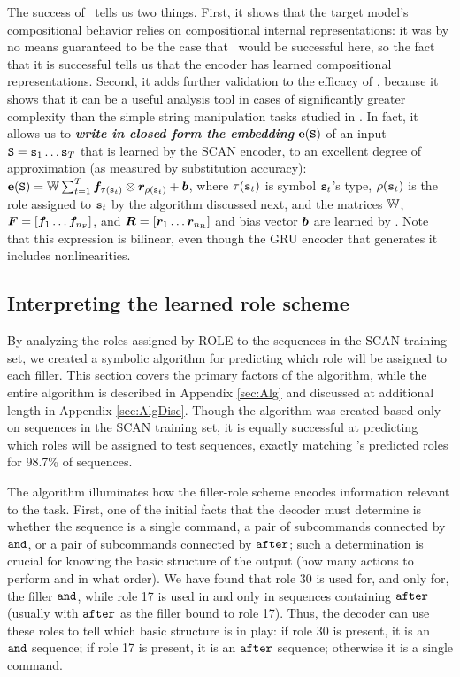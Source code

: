The success of \RLN\ 
tells us two things. First, it shows that the target model's compositional behavior relies on compositional internal representations: it was by no means guaranteed to be the case that \RLN\ would be successful here, so the fact that it is successful tells us that the encoder has learned compositional representations. Second, it adds further validation to the efficacy of \RLN, because it shows that it can be a useful analysis tool in cases of significantly greater complexity than the simple string manipulation tasks studied in \citet{mccoy}. 
In fact, it allows us to \textit{\textbf{write in closed form the embedding}} ${\mathbf{e}}({\mathtt{S}})$ of an input ${\mathtt{S}} = {\mathtt{s}}_1\ldots{\mathtt{s}}_T$ that is learned by the SCAN encoder, to an excellent degree of approximation (as measured by substitution accuracy):
${\mathbf{e}}({\mathtt{S}}) = {\mathbb{W}} \sum_{t=1}^T {\bm{f}}_{\tau({\mathtt{s}}_t)} \otimes {\bm{r}}_{\rho({\mathtt{s}}_t)} + {\bm{b}}$, where $\tau({\mathtt{s}}_t)$ is symbol ${\mathtt{s}}_t$'s type, $\rho({\mathtt{s}}_t)$ is the role assigned to ${\mathtt{s}}_t$ by the algorithm discussed next,
and the matrices ${\mathbb{W}}$, ${\bm{F}} = [{\bm{f}}_1 \ldots {\bm{f}}_{n_{\mathrm{F}}} ]$, and ${\bm{R}} = [{\bm{r}}_1 \ldots {\bm{r}}_{n_{\mathrm{R}}}]$ and bias vector ${\bm{b}}$ are learned by \RLN.
Note that this expression is bilinear, even though the GRU encoder that generates it includes nonlinearities.

\subsection{Interpreting the learned role scheme}\label{sec:scan-role-interpretation}

By analyzing the roles assigned by ROLE to the sequences in the SCAN training set, we created a symbolic algorithm for predicting which role will be assigned to each filler. This section covers the primary factors of the algorithm, while the entire algorithm is described in Appendix \ref{sec:Alg} and discussed at additional length in Appendix \ref{sec:AlgDisc}. Though the algorithm was created based only on sequences in the SCAN training set, it is equally successful at predicting which roles will be assigned to test sequences, exactly matching \RLN's predicted roles for 98.7\% of sequences.

The algorithm illuminates how the filler-role scheme encodes information relevant to the task. First, one of the initial facts that the decoder must determine is whether the sequence is a single command, a pair of subcommands connected by \textcolor{violet}{${\mathtt{and}}$}, or a pair of subcommands connected by \textcolor{violet}{${\mathtt{after}}$}; such a determination is crucial for knowing the basic structure of the output (how many actions to perform and in what order). We have found that role 30 is used for, and only for, the filler \textcolor{violet}{${\mathtt{and}}$}, while role 17 is used in and only in sequences containing \textcolor{violet}{${\mathtt{after}}$} (usually with \textcolor{violet}{${\mathtt{after}}$} as the filler bound to role 17). Thus, the decoder can use these roles to tell which basic structure is in play: if role 30 is present, it is an \textcolor{violet}{${\mathtt{and}}$} sequence; if role 17 is present, it is an \textcolor{violet}{${\mathtt{after}}$} sequence; otherwise it is a single command.

